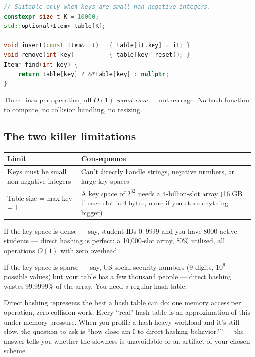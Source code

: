 \documentclass[11pt]{article}
\begin{document}
\begin{examplebox}
\begin{lstlisting}[language=C++,basicstyle=\ttfamily\small,frame=single]
// Suitable only when keys are small non-negative integers.
constexpr size_t K = 10000;
std::optional<Item> table[K];

void insert(const Item& it)   { table[it.key] = it; }
void remove(int key)          { table[key].reset(); }
Item* find(int key) {
    return table[key] ? &*table[key] : nullptr;
}
\end{lstlisting}
\end{examplebox}

Three lines per operation, all $O(1)$ \emph{worst case} --- not
average. No hash function to compute, no collision handling, no
resizing.

\subsection*{The two killer limitations}

\begin{center}
\begin{tabular}{|l|p{9cm}|}
\hline
\textbf{Limit} & \textbf{Consequence} \\
\hline
Keys must be small non-negative integers & Can't directly handle strings, negative numbers, or large key spaces \\
Table size = max key + 1                 & A key space of $2^{32}$ needs a 4-billion-slot array (16 GB if each slot is 4 bytes, more if you store anything bigger) \\
\hline
\end{tabular}
\end{center}

If the key space is dense --- say, student IDs 0--9999 and you
have 8000 active students --- direct hashing is perfect: a
10,000-slot array, 80\% utilized, all operations $O(1)$ with zero
overhead.

If the key space is sparse --- say, US social security numbers
(9 digits, $10^9$ possible values) but your table has a few
thousand people --- direct hashing wastes 99.9999\% of the array.
You need a regular hash table.

\begin{ideabox}
Direct hashing represents the best a hash table can do: one
memory access per operation, zero collision work. Every
``real'' hash table is an approximation of this under memory
pressure. When you profile a hash-heavy workload and it's still
slow, the question to ask is ``how close am I to direct hashing
behavior?'' --- the answer tells you whether the slowness is
unavoidable or an artifact of your chosen scheme.
\end{ideabox}
\end{document}
